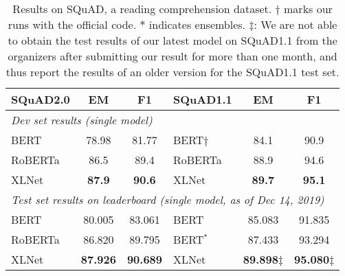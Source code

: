 \documentclass{article}
\begin{document}
\begin{table}[t!h]
  \small
  \centering
  
  \begin{tabular}{lcc|lcc}
    \toprule
    \bf SQuAD2.0 & \bf EM & \bf F1 & \bf SQuAD1.1 & \bf EM & \bf F1 \\
    \midrule
    \multicolumn{6}{l}{\it Dev set results (single model)} \\
    BERT \cite{devlin2018bert} & 78.98 & 81.77 & BERT$\dagger$ \cite{devlin2018bert} & 84.1 & 90.9 \\
    RoBERTa~\cite{liu2019roberta} & 86.5 & 89.4 & RoBERTa \cite{liu2019roberta}  & 88.9 & 94.6 \\
    XLNet & \bf 87.9 & \bf 90.6 & XLNet & \bf 89.7 & \bf 95.1 \\
    \midrule
    \multicolumn{6}{l}{\it Test set results on leaderboard (single model, as of Dec 14, 2019)} \\
    BERT~\cite{devlin2018bert} & 80.005 & 83.061 & BERT~\cite{devlin2018bert} & 85.083 & 91.835 \\
    RoBERTa~\cite{liu2019roberta} & 86.820 & 89.795 & BERT$^*$~\cite{devlin2018bert} & 87.433 & 93.294 \\
    XLNet & \bf 87.926 & \bf 90.689 & XLNet & \bf 89.898$\ddagger$ & \bf 95.080$\ddagger$ \\
    \bottomrule
  \end{tabular}
  \caption{\small
Results on SQuAD, a reading comprehension dataset.
    $\dagger$ marks our runs with the official code. $*$ indicates ensembles.
    $\ddagger$: We are not able to obtain the test results of our latest model on SQuAD1.1 from the organizers after submitting our result for more than one month, and thus report the results of an older version for the SQuAD1.1 test set.
  }
  \label{tab:sota-squad}
\end{table}
\end{document}
